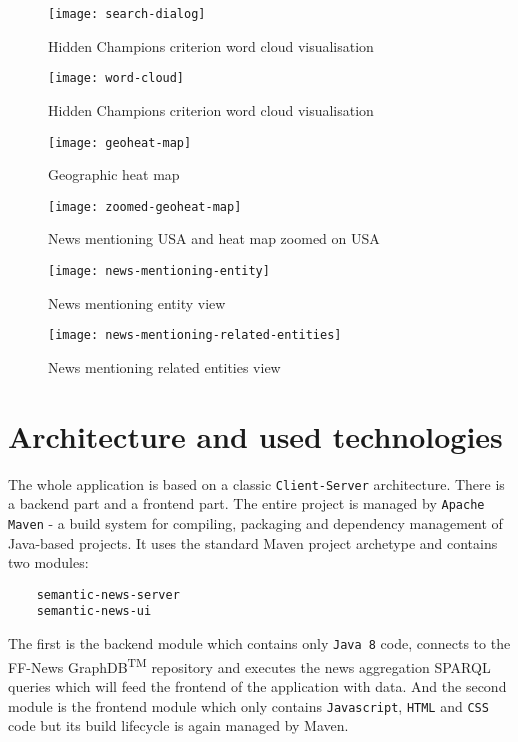 \begin{figure*}[ht!]
    \centering
    \texttt{[image: search-dialog]}
    \caption{Hidden Champions criterion word cloud visualisation}
    \label{fig:search-dialog}
\end{figure*}

\begin{figure}[h!]
    \centering
    \texttt{[image: word-cloud]}
    \caption{Hidden Champions criterion word cloud visualisation}
    \label{fig:word-cloud-hidden-champions}
\end{figure}

\begin{figure}[h!]
    \centering
    \texttt{[image: geoheat-map]}
    \caption{Geographic heat map}
    \label{fig:geoheat-map}
\end{figure}

\begin{figure}[h!]
    \centering
    \texttt{[image: zoomed-geoheat-map]}
    \caption{News mentioning USA and heat map zoomed on USA}
    \label{fig:zoomed-geoheat-map}
\end{figure}

\begin{figure}[h!]
    \centering
    \texttt{[image: news-mentioning-entity]}
    \caption{News mentioning entity view}
    \label{fig:news-mentioning-entity}
\end{figure}

\begin{figure}[h!]
    \centering
    \texttt{[image: news-mentioning-related-entities]}
    \caption{News mentioning related entities view}
    \label{fig:news-mentioning-related-entities}
\end{figure}



\section{Architecture and used technologies}
The whole application is based on a classic \verb|Client-Server| architecture. There is a backend part and a frontend part. The entire project is managed by \verb|Apache Maven| - a build system for compiling, packaging and dependency management of Java-based projects. It uses the standard Maven project archetype and contains two modules:
\begin{verbatim}
    semantic-news-server
    semantic-news-ui
\end{verbatim}
The first is the backend module which contains only \verb|Java 8| code, connects to the FF-News GraphDB\textsuperscript{TM} repository and executes the news aggregation SPARQL queries which will feed the frontend of the application with data. And the second module is the frontend module which only contains \verb|Javascript|, \verb|HTML| and \verb|CSS| code but its build lifecycle is again managed by Maven.

